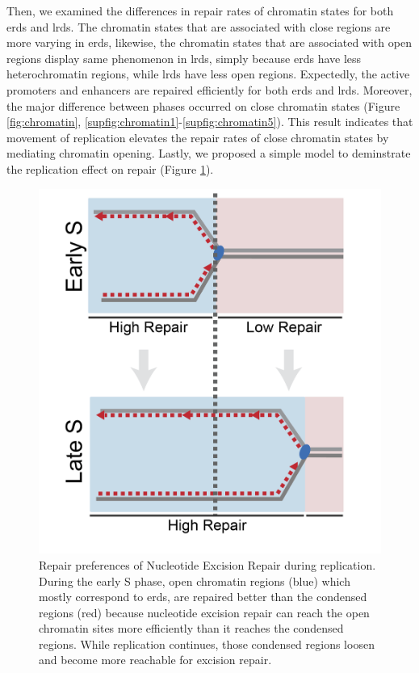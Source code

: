 Then, we examined the differences in repair rates of chromatin states for both \gls{erd}s and \gls{lrd}s. The chromatin states that are associated with close regions are more varying in \gls{erd}s, likewise, the chromatin states that are associated with open regions display same phenomenon in \gls{lrd}s, simply because \gls{erd}s have less heterochromatin regions, while \gls{lrd}s have less open regions. Expectedly, the active promoters and enhancers are repaired efficiently for both \gls{erd}s and \gls{lrd}s. Moreover, the major difference between phases occurred on close chromatin states (Figure \ref{fig:chromatin}, \ref{supfig:chromatin1}-\ref{supfig:chromatin5}). This result indicates that movement of replication elevates the repair rates of close chromatin states by mediating chromatin opening. Lastly, we proposed a simple model to deminstrate the replication effect on repair (Figure \ref{fig:model}).     

\begin{figure}[H]
    \begin{center}
    \includegraphics[width=0.8\columnwidth]{Chapters/5_discussion/figures/model}
    \caption[Repair preferences of Nucleotide Excision Repair during replication.]{Repair preferences of Nucleotide Excision Repair during replication. During the early S phase, open chromatin regions (blue) which mostly correspond to \gls{erd}s, are repaired better than the condensed regions (red) because nucleotide excision repair can reach the open chromatin sites more efficiently than it reaches the condensed regions. While replication continues, those condensed regions loosen and become more reachable for excision repair.}
    \label{fig:model}
    \end{center}
    \end{figure}

